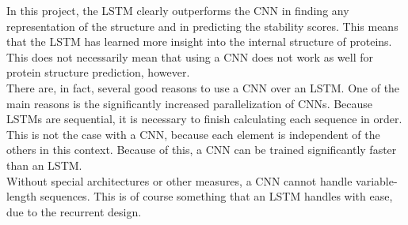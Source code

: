 In this project, the LSTM clearly outperforms the CNN in finding any representation of the structure and in predicting the stability scores. This means that the LSTM has learned more insight into the internal structure of proteins. This does not necessarily mean that using a CNN does not work as well for protein structure prediction, however.\\

\noindent
There are, in fact, several good reasons to use a CNN over an LSTM. One of the main reasons is the significantly increased parallelization of CNNs. Because LSTMs are sequential, it is necessary to finish calculating each sequence in order. This is not the case with a CNN, because each element is independent of the others in this context. Because of this, a CNN can be trained significantly faster than an LSTM.\\

\noindent
Without special architectures or other measures, a CNN cannot handle variable-length sequences. This is of course something that an LSTM handles with ease, due to the recurrent design.



